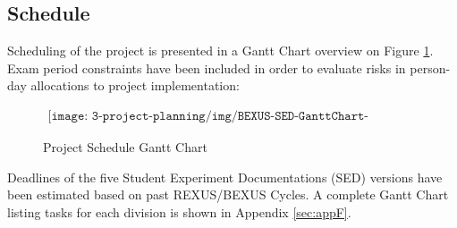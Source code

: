 \subsection{Schedule}

Scheduling of the project is presented in a Gantt Chart overview on Figure \ref{fig:schedule-gantt-chart}. Exam period constraints have been included in order to evaluate risks in person-day allocations to project implementation:

\begin{figure}[H]
    \begin{align*}
        \texttt{[image: 3-project-planning/img/BEXUS-SED-GanttChart-Overview.png]}
    \end{align*}
    \caption{Project Schedule Gantt Chart}\label{fig:schedule-gantt-chart}
\end{figure}

Deadlines of the five Student Experiment Documentations (SED) versions have been estimated based on past REXUS/BEXUS Cycles. A complete Gantt Chart listing tasks for each division is shown in Appendix \ref{sec:appF}.